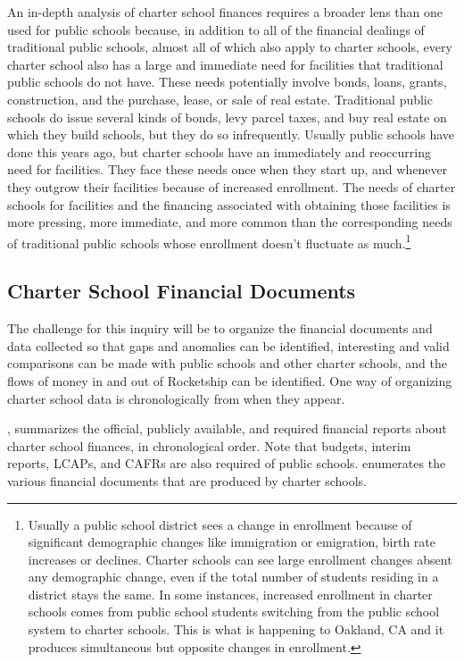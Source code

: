 An in-depth analysis of charter school finances requires a broader lens than one used for public schools because, in addition to all of the financial dealings of traditional public schools, almost all of which also apply to charter schools, every charter school also has a large and immediate need for facilities that traditional public schools do not have. These needs potentially involve  bonds, loans, grants, construction, and the purchase, lease, or sale of real estate. Traditional public schools do issue several kinds of bonds, levy parcel taxes, and buy real estate on which they build schools, but they do so infrequently. Usually public schools have done this years ago, but charter schools have an immediately and reoccurring need for facilities. They face these needs once when they start up, and whenever they outgrow their facilities because of increased enrollment. The needs of charter schools for facilities and the financing associated with obtaining those facilities is more pressing, more immediate, and more common than the corresponding needs of traditional public schools whose enrollment doesn't fluctuate as much.\footnote{Usually a public school district sees a change in enrollment because of significant demographic changes like immigration or emigration, birth rate increases or declines. Charter schools can see large enrollment changes absent any demographic change, even if the total number of students residing in a district stays the same. In some instances, increased enrollment in charter schools comes from public school students switching from the public school system to charter schools. This is what is happening to Oakland, CA and it produces simultaneous but opposite changes in enrollment.}

\subsection{Charter School Financial Documents}\label{sec:charter-financial-docs}\indent%

The challenge for this inquiry will be to organize the financial documents and data collected so that gaps and anomalies can be identified, interesting and valid comparisons can be made with public schools and other charter schools, and the flows of money in and out of Rocketship can be identified. One way of organizing charter school data is chronologically from when they appear.

, summarizes the official, publicly available, and required financial reports about charter school finances, in chronological order. Note that budgets, interim reports, LCAPs, and CAFRs are also required of public schools.  enumerates the various financial documents that are produced by charter schools. 


